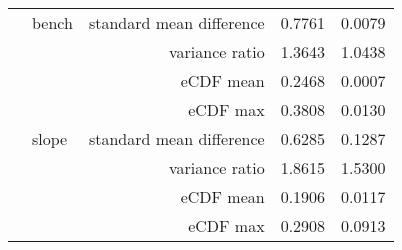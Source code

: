 \begin{table}[!htp]
\begin{tabular}{llrrr}
 & bench & standard mean difference & 0.7761 & \cellcolor{customgreen} 0.0079 \\
 &  & variance ratio & 1.3643 & \cellcolor{customgreen} 1.0438 \\
 &  & eCDF mean & 0.2468 & \cellcolor{customgreen} 0.0007 \\
 &  & eCDF max & 0.3808 & \cellcolor{customgreen} 0.0130 \\
 & slope & standard mean difference & 0.6285 & \cellcolor{customgreen} 0.1287 \\
 &  & variance ratio & 1.8615 & \cellcolor{customgreen} 1.5300 \\
 &  & eCDF mean & 0.1906 & \cellcolor{customgreen} 0.0117 \\
 &  & eCDF max & 0.2908 & \cellcolor{customgreen} 0.0913 \\
\bottomrule
\end{tabular}
\end{table}

